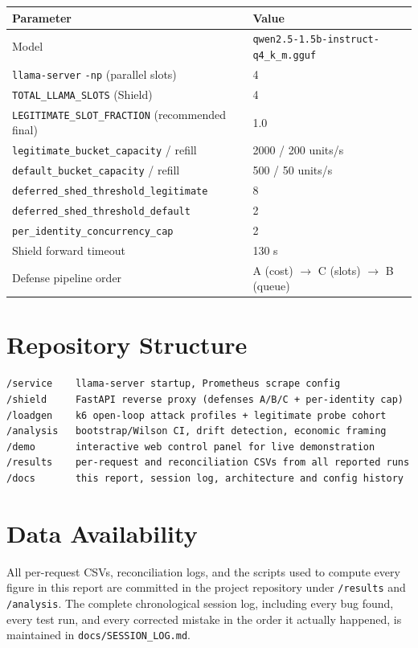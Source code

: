 \documentclass[11pt]{article}
\begin{document}
\begin{center}
\begin{tabular}{ll}
\toprule
Parameter & Value \\
\midrule
Model & \texttt{qwen2.5-1.5b-instruct-q4\_k\_m.gguf} \\
\texttt{llama-server} \texttt{-np} (parallel slots) & 4 \\
\texttt{TOTAL\_LLAMA\_SLOTS} (Shield) & 4 \\
\texttt{LEGITIMATE\_SLOT\_FRACTION} (recommended final) & 1.0 \\
\texttt{legitimate\_bucket\_capacity} / refill & 2000 / 200 units/s \\
\texttt{default\_bucket\_capacity} / refill & 500 / 50 units/s \\
\texttt{deferred\_shed\_threshold\_legitimate} & 8 \\
\texttt{deferred\_shed\_threshold\_default} & 2 \\
\texttt{per\_identity\_concurrency\_cap} & 2 \\
Shield forward timeout & 130 s \\
Defense pipeline order & A (cost) $\to$ C (slots) $\to$ B (queue) \\
\bottomrule
\end{tabular}
\end{center}

\section{Repository Structure}

\begin{lstlisting}
/service    llama-server startup, Prometheus scrape config
/shield     FastAPI reverse proxy (defenses A/B/C + per-identity cap)
/loadgen    k6 open-loop attack profiles + legitimate probe cohort
/analysis   bootstrap/Wilson CI, drift detection, economic framing
/demo       interactive web control panel for live demonstration
/results    per-request and reconciliation CSVs from all reported runs
/docs       this report, session log, architecture and config history
\end{lstlisting}

\section{Data Availability}

All per-request CSVs, reconciliation logs, and the scripts used to compute
every figure in this report are committed in the project repository under
\texttt{/results} and \texttt{/analysis}. The complete chronological session
log, including every bug found, every test run, and every corrected mistake
in the order it actually happened, is maintained in
\texttt{docs/SESSION\_LOG.md}.
\end{document}
